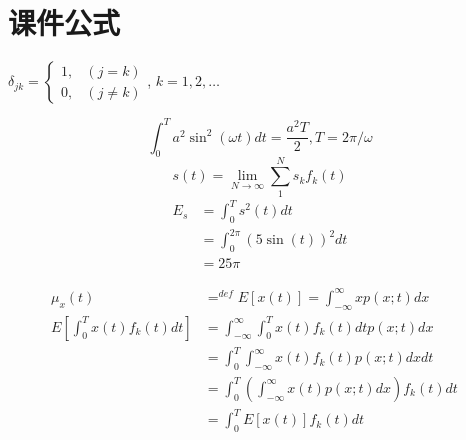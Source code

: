 \section{课件公式}

\begin{frame}
$\delta_{jk}=
\begin{cases}
	1, & (j=k)\\
	0, & (j\ne k)
\end{cases}
$, $k=1,2,\dots$
\end{frame}

\begin{frame}
\[\int_{0}^{T}a^2\sin^2(\omega t)dt=\frac{a^2T}{2}, T=2\pi/\omega\]
\[s(t)=\lim\limits_{N\to \infty}\sum_{1}^{N}s_kf_k(t)\]
\begin{align*}
E_s&=\int_{0}^{T}s^2(t)dt\\
&=\int_{0}^{2\pi}(5\sin(t))^2dt\\
&=25\pi
\end{align*}
\end{frame}

\begin{frame}
\begin{align*}
\mu_x(t)&\mathop{=}^{def}E[x(t)]=\int_{-\infty}^{\infty}xp(x;t)dx&\\
E[\int_{0}^{T}x(t)f_k(t)dt]&=\int_{-\infty}^{\infty}\int_{0}^{T}x(t)f_k(t)dtp(x;t)dx\\
&=\int_{0}^{T}\int_{-\infty}^{\infty}x(t)f_k(t)p(x;t)dxdt\\
&=\int_{0}^{T}\left(\int_{-\infty}^{\infty}x(t)p(x;t)dx\right)f_k(t)dt\\
&=\int_{0}^{T}E[x(t)]f_k(t)dt\\
\end{align*}
\end{frame}



